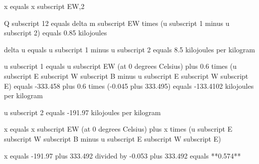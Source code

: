 x equals x subscript EW,2  

Q subscript 12 equals delta m subscript EW times (u subscript 1 minus u subscript 2) equals 0.85 kilojoules  

delta u equals u subscript 1 minus u subscript 2 equals 8.5 kilojoules per kilogram  

u subscript 1 equals u subscript EW (at 0 degrees Celsius) plus 0.6 times (u subscript E subscript W subscript B minus u subscript E subscript W subscript E) equals -333.458 plus 0.6 times (-0.045 plus 333.495) equals -133.4102 kilojoules per kilogram  

u subscript 2 equals -191.97 kilojoules per kilogram  

x equals x subscript EW (at 0 degrees Celsius) plus x times (u subscript E subscript W subscript B minus u subscript E subscript W subscript E)  

x equals -191.97 plus 333.492 divided by -0.053 plus 333.492 equals **0.574**